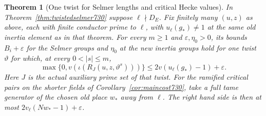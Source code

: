 \documentclass[a4paper,11pt]{article}
\newtheorem{theorem}[proposition]{Theorem}
\theoremstyle{definition}
\theoremstyle{remark}
\numberwithin{equation}{section}
\begin{document}
\begin{theorem}[One twist for Selmer lengths and critical Hecke values]
\leavevmode\label{thm:commoncritical731}
In Theorem~\ref{thm:twistedselmer730} suppose \(\ell\nmid D_E\).
Fix finitely many \((u,z)\) as above, each with finite conductor
prime to \(\ell\), with \(u_\ell(g_*)\ne1\) at the same old
inertia element as in that theorem. For every \(m\ge1\) and
\(\varepsilon,\eta_0>0\), its bounds \(B_i+\varepsilon\) for the
Selmer groups and \(\eta_0\) at the new inertia groups hold for
one twist \(\vartheta\) for which, at every \(0<|s|\le m\),
\[
    \max\{0,v(\iota(R_J(u,z,\vartheta^s)))\}
          \le 2v(u_\ell(g_*)-1)+\varepsilon .
    \tag{2}\label{eq:samebounds731}
\]
Here \(J\) is the actual auxiliary prime set of that twist.
For the ramified critical pairs on the shorter fields of
Corollary~\ref{cor:maincost730}, take a full tame generator of the
chosen old place \(w_*\) away from \(\ell\). The right hand side is
then at most \(2v_\ell(Nw_*-1)+\varepsilon\).
\end{theorem}
\end{document}
